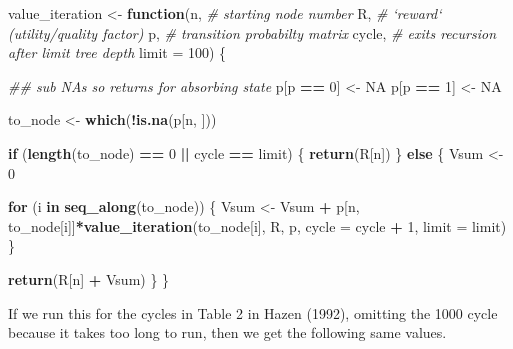 \documentclass[]{book}
\newenvironment{Shaded}{\begin{snugshade}}{\end{snugshade}}
\newcommand{\CommentTok}[1]{\textcolor[rgb]{0.56,0.35,0.01}{\textit{#1}}}
\newcommand{\ControlFlowTok}[1]{\textcolor[rgb]{0.13,0.29,0.53}{\textbf{#1}}}
\newcommand{\DataTypeTok}[1]{\textcolor[rgb]{0.13,0.29,0.53}{#1}}
\newcommand{\DecValTok}[1]{\textcolor[rgb]{0.00,0.00,0.81}{#1}}
\newcommand{\KeywordTok}[1]{\textcolor[rgb]{0.13,0.29,0.53}{\textbf{#1}}}
\newcommand{\NormalTok}[1]{#1}
\newcommand{\OperatorTok}[1]{\textcolor[rgb]{0.81,0.36,0.00}{\textbf{#1}}}
\newcommand{\OtherTok}[1]{\textcolor[rgb]{0.56,0.35,0.01}{#1}}
\newcommand{\StringTok}[1]{\textcolor[rgb]{0.31,0.60,0.02}{#1}}
\begin{document}
\begin{Shaded}
\begin{Highlighting}[]
\NormalTok{value_iteration <-}\StringTok{ }\ControlFlowTok{function}\NormalTok{(n,        }\CommentTok{# starting node number}
\NormalTok{                            R,        }\CommentTok{# `reward` (utility/quality factor)}
\NormalTok{                            p,        }\CommentTok{# transition probabilty matrix}
\NormalTok{                            cycle,    }\CommentTok{# exits recursion after limit tree depth}
                            \DataTypeTok{limit =} \DecValTok{100}\NormalTok{) \{}
  
  \CommentTok{## sub NAs so returns for absorbing state}
\NormalTok{  p[p }\OperatorTok{==}\StringTok{ }\DecValTok{0}\NormalTok{] <-}\StringTok{ }\OtherTok{NA}
\NormalTok{  p[p }\OperatorTok{==}\StringTok{ }\DecValTok{1}\NormalTok{] <-}\StringTok{ }\OtherTok{NA}

\NormalTok{  to_node <-}\StringTok{ }\KeywordTok{which}\NormalTok{(}\OperatorTok{!}\KeywordTok{is.na}\NormalTok{(p[n, ]))}

  \ControlFlowTok{if}\NormalTok{ (}\KeywordTok{length}\NormalTok{(to_node) }\OperatorTok{==}\StringTok{ }\DecValTok{0} \OperatorTok{||}\StringTok{ }\NormalTok{cycle }\OperatorTok{==}\StringTok{ }\NormalTok{limit) \{}
    \KeywordTok{return}\NormalTok{(R[n])}
\NormalTok{  \}}
  \ControlFlowTok{else}\NormalTok{ \{}
\NormalTok{    Vsum <-}\StringTok{ }\DecValTok{0}
    
    \ControlFlowTok{for}\NormalTok{ (i }\ControlFlowTok{in} \KeywordTok{seq_along}\NormalTok{(to_node)) \{}
\NormalTok{      Vsum <-}\StringTok{ }\NormalTok{Vsum }\OperatorTok{+}\StringTok{ }\NormalTok{p[n, to_node[i]]}\OperatorTok{*}\KeywordTok{value_iteration}\NormalTok{(to_node[i], R, p,}
                                                      \DataTypeTok{cycle =}\NormalTok{ cycle }\OperatorTok{+}\StringTok{ }\DecValTok{1}\NormalTok{, }\DataTypeTok{limit =}\NormalTok{ limit)}
\NormalTok{    \}}
    
    \KeywordTok{return}\NormalTok{(R[n] }\OperatorTok{+}\StringTok{ }\NormalTok{Vsum)}
\NormalTok{  \}}
\NormalTok{\}}
\end{Highlighting}
\end{Shaded}

If we run this for the cycles in Table 2 in Hazen (1992), omitting the 1000 cycle because it takes too long to run, then we get the following same values.
\end{document}
